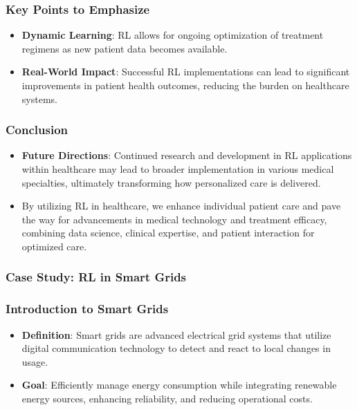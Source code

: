 \documentclass[aspectratio=169]{beamer}
\begin{document}
\begin{frame}[fragile]
  \frametitle{Key Points to Emphasize}
  \begin{itemize}
      \item \textbf{Dynamic Learning}: RL allows for ongoing optimization of treatment regimens as new patient data becomes available.
      \item \textbf{Real-World Impact}: Successful RL implementations can lead to significant improvements in patient health outcomes, reducing the burden on healthcare systems.
  \end{itemize}
\end{frame}

\begin{frame}[fragile]
  \frametitle{Conclusion}
  \begin{itemize}
      \item \textbf{Future Directions}: Continued research and development in RL applications within healthcare may lead to broader implementation in various medical specialties, ultimately transforming how personalized care is delivered.
      \item By utilizing RL in healthcare, we enhance individual patient care and pave the way for advancements in medical technology and treatment efficacy, combining data science, clinical expertise, and patient interaction for optimized care.
  \end{itemize}
\end{frame}

\begin{frame}[fragile]
  \frametitle{Case Study: RL in Smart Grids}
\end{frame}

\begin{frame}[fragile]
  \frametitle{Introduction to Smart Grids}
  \begin{itemize}
    \item \textbf{Definition}: Smart grids are advanced electrical grid systems that utilize digital communication technology to detect and react to local changes in usage.
    \item \textbf{Goal}: Efficiently manage energy consumption while integrating renewable energy sources, enhancing reliability, and reducing operational costs.
  \end{itemize}
\end{frame}
\end{document}
